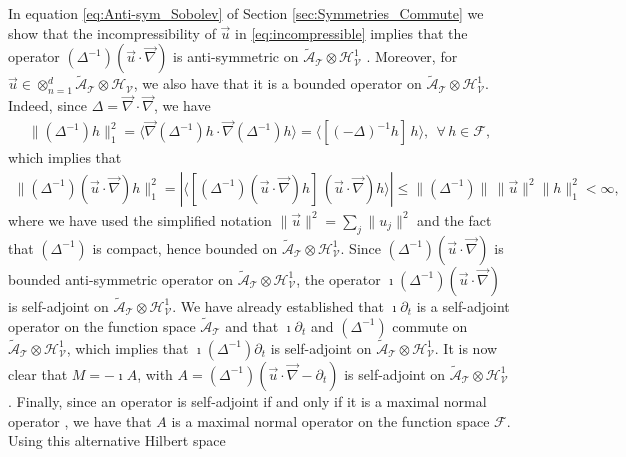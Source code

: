 \documentclass[11pt]{amsart}
\newcommand{\Tc}{\mathcal{T}}
\newcommand{\Vc}{\mathcal{V}}
\newcommand{\Hc}{\mathcal{H}}
\newcommand{\Fc}{\mathcal{F}}
\newcommand{\As}{\mathscr{A}}
\begin{document}
In equation \eqref{eq:Anti-sym_Sobolev} of Section
\ref{sec:Symmetries_Commute} we show that the incompressibility of
$\vec{u}$ in \eqref{eq:incompressible} implies that the operator
$(\Delta^{-1})(\vec{u}\cdot\vec{\nabla})$ is anti-symmetric on
$\tilde{\As}_{\Tc}\otimes\Hc^1_{\Vc}$ \cite{Bhattacharya:AAP:1999:951}.
Moreover, for $\vec{u}\in\otimes_{n=1}^d\tilde{\As}_{\Tc}\otimes\Hc_{\Vc}$, we also have that 
it is a bounded operator on $\tilde{\As}_{\Tc}\otimes\Hc^1_{\Vc}$. Indeed,
since $\Delta=\vec{\nabla}\cdot\vec{\nabla}$, we have 
%
\begin{align}\label{eq:H1_L2}
  \|(\Delta^{-1})h\|_1^2=\langle\vec{\nabla}(\Delta^{-1})h\cdot\vec{\nabla}(\Delta^{-1})h\rangle=\langle[(-\Delta)^{-1}h]\,h\rangle,
  \ \ \forall \,h\in\Fc,
\end{align}
%
which implies that
%
\begin{align}\label{eq:Bounded_A_Sobolov}
  \|(\Delta^{-1})(\vec{u}\cdot\vec{\nabla})h\|_1^2
    =|\langle[(\Delta^{-1})(\vec{u}\cdot\vec{\nabla})h]\, (\vec{u}\cdot\vec{\nabla})h \rangle|
   \leq\|(\Delta^{-1})\|\,\|\vec{u}\|^2\|h\|_1^2
   <\infty,
\end{align}
%
where we have used the simplified notation $\|\vec{u}\|^2=\sum_j\|u_j\|^2$
and the fact \cite{Stakgold:BVP:2000} that $(\Delta^{-1})$ is compact,
hence bounded on $\tilde{\As}_{\Tc}\otimes\Hc^1_{\Vc}$. Since
$(\Delta^{-1})(\vec{u}\cdot\vec{\nabla})$ is bounded anti-symmetric operator on
$\tilde{\As}_{\Tc}\otimes\Hc^1_{\Vc}$, the operator
$\imath(\Delta^{-1})(\vec{u}\cdot\vec{\nabla})$ is self-adjoint on
$\tilde{\As}_{\Tc}\otimes\Hc^1_{\Vc}$. We have already
established that $\imath\partial_t$ is a self-adjoint operator on the function
space $\tilde{\As}_{\Tc}$ and that $\imath\partial_t$ and $(\Delta^{-1})$ commute on
$\tilde{\As}_{\Tc}\otimes\Hc^1_{\Vc}$, which implies that $\imath(\Delta^{-1})\partial_t$ is
self-adjoint on $\tilde{\As}_{\Tc}\otimes\Hc^1_{\Vc}$. It is now clear that
$M=-\imath A$, with $A=(\Delta^{-1})(\vec{u}\cdot\vec{\nabla}-\partial_t)$ is self-adjoint on
$\tilde{\As}_{\Tc}\otimes\Hc^1_{\Vc}$. Finally, since an operator is
self-adjoint if and only if it is a maximal normal operator
\cite{Stone:64}, we have that $A$ is a maximal normal operator on
the function space $\Fc$. Using this alternative Hilbert space
\end{document}
